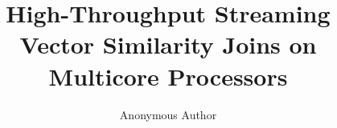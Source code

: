 \documentclass[sigconf,authordraft]{acmart}
\author{Anonymous Author}
\begin{document}
\title{High-Throughput Streaming Vector Similarity Joins on Multicore Processors}

% 



\keywords{}

\maketitle

% 









\nocite{*}


\end{document}
